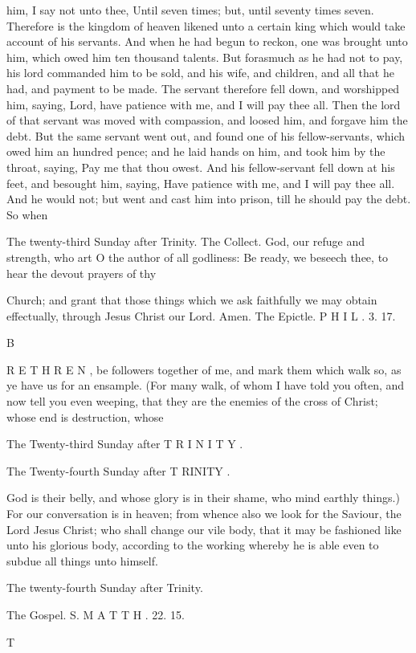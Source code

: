 him, I say not unto thee, Until seven times; but, until seventy times seven. Therefore is the kingdom of heaven likened unto a certain king which would take account of his servants. And when he had begun to reckon, one was brought unto him, which owed him ten thousand talents. But forasmuch as he had not to pay, his lord commanded him to be sold, and his wife, and children, and all that he had, and payment to be made. The servant therefore fell down, and worshipped him, saying, Lord, have patience with me, and I will pay thee all. Then the lord of that servant was moved with compassion, and loosed him, and forgave him the debt. But the same servant went out, and found one of his fellow-servants, which owed him an hundred pence; and he laid hands on him, and took him by the throat, saying, Pay me that thou owest. And his fellow-servant fell down at his feet, and besought him, saying, Have patience with me, and I will pay thee all. And he would not; but went and cast him into prison, till he should pay the debt. So when

The twenty-third Sunday after Trinity. The Collect. God, our refuge and strength, who art O the author of all godliness: Be ready, we beseech thee, to hear the devout prayers of thy

Church; and grant that those things which we ask faithfully we may obtain effectually, through Jesus Christ our Lord. Amen. The Epictle. P H I L . 3. 17.

B

R E T H R E N , be followers together of me, and mark them which walk so, as ye have us for an ensample. (For many walk, of whom I have told you often, and now tell you even weeping, that they are the enemies of the cross of Christ; whose end is destruction, whose

The Twenty-third Sunday after T R I N I T Y .

The Twenty-fourth Sunday after T RINITY .

God is their belly, and whose glory is in their shame, who mind earthly things.) For our conversation is in heaven; from whence also we look for the Saviour, the Lord Jesus Christ; who shall change our vile body, that it may be fashioned like unto his glorious body, according to the working whereby he is able even to subdue all things unto himself.

The twenty-fourth Sunday after Trinity.

The Gospel. S. M A T T H . 22. 15.

T

